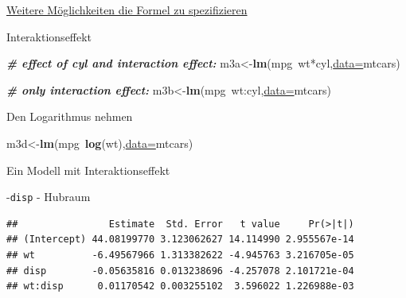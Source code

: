 \documentclass[
  ignorenonframetext,
]{beamer}
\newenvironment{Shaded}{\begin{snugshade}}{\end{snugshade}}
\newcommand{\CommentTok}[1]{\textcolor[rgb]{0.00,0.40,1.00}{\textbf{\textit{#1}}}}
\newcommand{\DataTypeTok}[1]{\textcolor[rgb]{0.74,0.68,0.62}{\underline{#1}}}
\newcommand{\KeywordTok}[1]{\textcolor[rgb]{0.26,0.66,0.93}{\textbf{#1}}}
\newcommand{\NormalTok}[1]{\textcolor[rgb]{0.74,0.68,0.62}{#1}}
\newcommand{\OperatorTok}[1]{\textcolor[rgb]{0.74,0.68,0.62}{#1}}
\newcommand{\StringTok}[1]{\textcolor[rgb]{0.02,0.61,0.04}{#1}}
\begin{document}
\begin{frame}[fragile]{\href{https://cran.r-project.org/web/packages/Formula/vignettes/Formula.pdf}{Weitere
Möglichkeiten die Formel zu spezifizieren}}
\protect\hypertarget{weitere-moglichkeiten-die-formel-zu-spezifizieren}{}

\begin{block}{Interaktionseffekt}

\begin{Shaded}
\begin{Highlighting}[]
\CommentTok{# effect of cyl and interaction effect:}
\NormalTok{m3a<-}\KeywordTok{lm}\NormalTok{(mpg}\OperatorTok{~}\NormalTok{wt}\OperatorTok{*}\NormalTok{cyl,}\DataTypeTok{data=}\NormalTok{mtcars) }

\CommentTok{# only interaction effect:}
\NormalTok{m3b<-}\KeywordTok{lm}\NormalTok{(mpg}\OperatorTok{~}\NormalTok{wt}\OperatorTok{:}\NormalTok{cyl,}\DataTypeTok{data=}\NormalTok{mtcars) }
\end{Highlighting}
\end{Shaded}

\end{block}

\begin{block}{Den Logarithmus nehmen}

\begin{Shaded}
\begin{Highlighting}[]
\NormalTok{m3d<-}\KeywordTok{lm}\NormalTok{(mpg}\OperatorTok{~}\KeywordTok{log}\NormalTok{(wt),}\DataTypeTok{data=}\NormalTok{mtcars) }
\end{Highlighting}
\end{Shaded}

\end{block}

\end{frame}

\begin{frame}[fragile]{Ein Modell mit Interaktionseffekt}
\protect\hypertarget{ein-modell-mit-interaktionseffekt}{}

-\texttt{disp} - Hubraum

\begin{Shaded}
\end{Shaded}

\begin{verbatim}
##                Estimate  Std. Error   t value     Pr(>|t|)
## (Intercept) 44.08199770 3.123062627 14.114990 2.955567e-14
## wt          -6.49567966 1.313382622 -4.945763 3.216705e-05
## disp        -0.05635816 0.013238696 -4.257078 2.101721e-04
## wt:disp      0.01170542 0.003255102  3.596022 1.226988e-03
\end{verbatim}

\end{frame}
\end{document}
